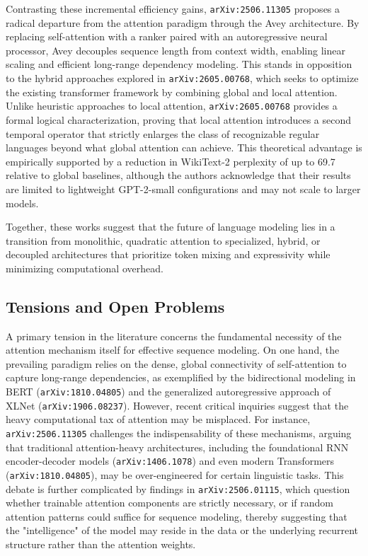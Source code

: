 \documentclass[11pt]{article}
\begin{document}
Contrasting these incremental efficiency gains, \texttt{arXiv:2506.11305} proposes a radical departure from the attention paradigm through the Avey architecture. By replacing self-attention with a ranker paired with an autoregressive neural processor, Avey decouples sequence length from context width, enabling linear scaling and efficient long-range dependency modeling. This stands in opposition to the hybrid approaches explored in \texttt{arXiv:2605.00768}, which seeks to optimize the existing transformer framework by combining global and local attention. Unlike heuristic approaches to local attention, \texttt{arXiv:2605.00768} provides a formal logical characterization, proving that local attention introduces a second temporal operator that strictly enlarges the class of recognizable regular languages beyond what global attention can achieve. This theoretical advantage is empirically supported by a reduction in WikiText-2 perplexity of up to 69.7 relative to global baselines, although the authors acknowledge that their results are limited to lightweight GPT-2-small configurations and may not scale to larger models.

Together, these works suggest that the future of language modeling lies in a transition from monolithic, quadratic attention to specialized, hybrid, or decoupled architectures that prioritize token mixing and expressivity while minimizing computational overhead.

\subsection{Tensions and Open Problems}

A primary tension in the literature concerns the fundamental necessity of the attention mechanism itself for effective sequence modeling. On one hand, the prevailing paradigm relies on the dense, global connectivity of self-attention to capture long-range dependencies, as exemplified by the bidirectional modeling in BERT (\texttt{arXiv:1810.04805}) and the generalized autoregressive approach of XLNet (\texttt{arXiv:1906.08237}). However, recent critical inquiries suggest that the heavy computational tax of attention may be misplaced. For instance, \texttt{arXiv:2506.11305} challenges the indispensability of these mechanisms, arguing that traditional attention-heavy architectures, including the foundational RNN encoder-decoder models (\texttt{arXiv:1406.1078}) and even modern Transformers (\texttt{arXiv:1810.04805}), may be over-engineered for certain linguistic tasks. This debate is further complicated by findings in \texttt{arXiv:2506.01115}, which question whether trainable attention components are strictly necessary, or if random attention patterns could suffice for sequence modeling, thereby suggesting that the "intelligence" of the model may reside in the data or the underlying recurrent structure rather than the attention weights.
\end{document}
